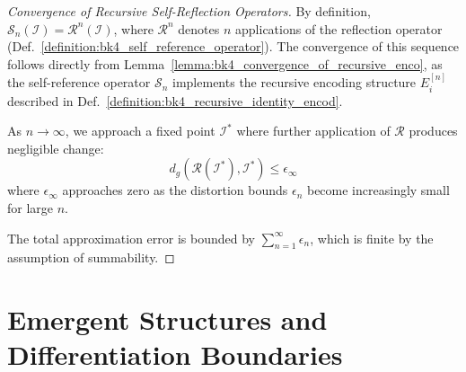 \begin{proof}[Convergence of Recursive Self-Reflection Operators]
\label{proof:bk4_recursive_reflection_convergence}
By definition, $\mathcal{S}_n(\mathcal{I}) = \mathcal{R}^n(\mathcal{I})$, where $\mathcal{R}^n$ denotes $n$ applications of the reflection operator (Def.~\ref{definition:bk4_self_reference_operator}). The convergence of this sequence follows directly from Lemma~\ref{lemma:bk4_convergence_of_recursive_enco}, as the self-reference operator $\mathcal{S}_n$ implements the recursive encoding structure $E_i^{[n]}$ described in Def.~\ref{definition:bk4_recursive_identity_encod}.

As $n \to \infty$, we approach a fixed point $\mathcal{I}^*$ where further application of $\mathcal{R}$ produces negligible change:
\begin{equation}
    d_g(\mathcal{R}(\mathcal{I}^*), \mathcal{I}^*) \leq \epsilon_{\infty}
\end{equation}
where $\epsilon_{\infty}$ approaches zero as the distortion bounds $\epsilon_n$ become increasingly small for large $n$.

The total approximation error is bounded by $\sum_{n=1}^{\infty} \epsilon_n$, which is finite by the assumption of summability.
\end{proof}
\section{Emergent Structures and Differentiation Boundaries} \label{sec:bk4_emergent_structures_differentiation_boundaries}
